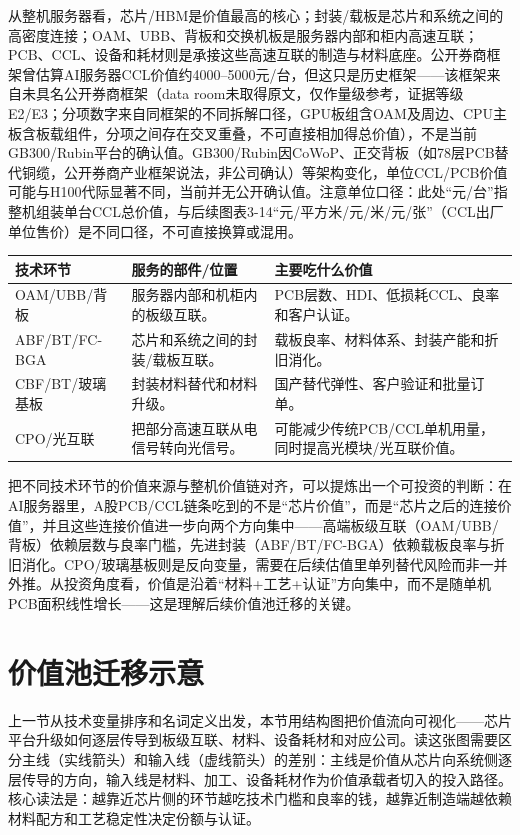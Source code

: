 从整机服务器看，芯片/HBM是价值最高的核心；封装/载板是芯片和系统之间的高密度连接；OAM、UBB、背板和交换机板是服务器内部和柜内高速互联；PCB、CCL、设备和耗材则是承接这些高速互联的制造与材料底座。公开券商框架曾估算AI服务器CCL价值约4000--5000元/台，但这只是历史框架——该框架来自未具名公开券商框架（data room未取得原文，仅作量级参考，证据等级E2/E3；分项数字来自同框架的不同拆解口径，GPU板组含OAM及周边、CPU主板含板载组件，分项之间存在交叉重叠，不可直接相加得总价值），不是当前GB300/Rubin平台的确认值。GB300/Rubin因CoWoP、正交背板（如78层PCB替代铜缆，公开券商产业框架说法，非公司确认）等架构变化，单位CCL/PCB价值可能与H100代际显著不同，当前并无公开确认值。注意单位口径：此处``元/台''指整机组装单台CCL总价值，与后续图表3-14``元/平方米/元/米/元/张''（CCL出厂单位售价）是不同口径，不可直接换算或混用。

\begin{exhibitbox}[图表3-3：技术差异与整机价值链位置]
\footnotesize
\begin{tabularx}{\textwidth}{L{2.4cm}X X}
\toprule
\textbf{技术环节} & \textbf{服务的部件/位置} & \textbf{主要吃什么价值} \\
\midrule
OAM/UBB/背板 & 服务器内部和机柜内的板级互联。 & PCB层数、HDI、低损耗CCL、良率和客户认证。 \\
ABF/BT/FC-BGA & 芯片和系统之间的封装/载板互联。 & 载板良率、材料体系、封装产能和折旧消化。 \\
CBF/BT/玻璃基板 & 封装材料替代和材料升级。 & 国产替代弹性、客户验证和批量订单。 \\
CPO/光互联 & 把部分高速互联从电信号转向光信号。 & 可能减少传统PCB/CCL单机用量，同时提高光模块/光互联价值。 \\
\bottomrule
\end{tabularx}
\end{exhibitbox}

把不同技术环节的价值来源与整机价值链对齐，可以提炼出一个可投资的判断：在AI服务器里，A股PCB/CCL链条吃到的不是``芯片价值''，而是``芯片之后的连接价值''，并且这些连接价值进一步向两个方向集中——高端板级互联（OAM/UBB/背板）依赖层数与良率门槛，先进封装（ABF/BT/FC-BGA）依赖载板良率与折旧消化。CPO/玻璃基板则是反向变量，需要在后续估值里单列替代风险而非一并外推。从投资角度看，价值是沿着``材料+工艺+认证''方向集中，而不是随单机PCB面积线性增长——这是理解后续价值池迁移的关键。

\section{价值池迁移示意}

上一节从技术变量排序和名词定义出发，本节用结构图把价值流向可视化——芯片平台升级如何逐层传导到板级互联、材料、设备耗材和对应公司。读这张图需要区分主线（实线箭头）和输入线（虚线箭头）的差别：主线是价值从芯片向系统侧逐层传导的方向，输入线是材料、加工、设备耗材作为价值承载者切入的投入路径。核心读法是：越靠近芯片侧的环节越吃技术门槛和良率的钱，越靠近制造端越依赖材料配方和工艺稳定性决定份额与认证。

